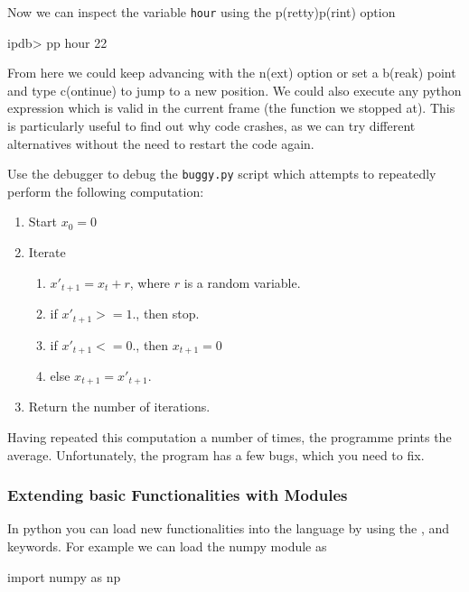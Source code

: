 Now we can inspect the variable \texttt{hour} using the p(retty)p(rint) option

\begin{python}
ipdb> pp hour
22
\end{python}

From here we could keep advancing with the n(ext) option or set a b(reak) point and type c(ontinue) to jump to a new position. We could also execute any python expression which is valid in the current frame (the function we stopped at). This is particularly useful to find out why code crashes, as we can try different alternatives without the need to restart the code again.

\begin{exercise}
Use the debugger to debug the \texttt{buggy.py} script which attempts to
repeatedly perform the following computation:

\begin{enumerate}
\item Start $x_0 = 0$
\item Iterate

\begin{enumerate}
\item $x'_{t+1} = x_t + r$, where $r$ is a random variable.
\item if $x'_{t+1} >= 1.$, then stop.
\item if $x'_{t+1} <= 0.$, then $x_{t+1} = 0$
\item else $x_{t+1} = x'_{t+1}$.
\end{enumerate}
\item Return the number of iterations.
\end{enumerate}

Having repeated this computation a number of times, the programme prints the
average. Unfortunately, the program has a few bugs, which you need to fix.
\end{exercise}


\subsubsection{Extending basic Functionalities with Modules}

In python you can load new functionalities into the language by using the ,  and  keywords. For example we can load the numpy module as

\begin{python}
import numpy as np
\end{python}

